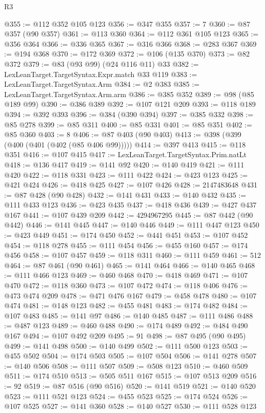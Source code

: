 \begin{lexlean}{R3}
\begin{coremodule}
@355 := @112 @352 @105 @123
@356 := @347 @355
@357 := 7
@360 := @87 @357 (@90 @357)
@361 := @113 @360
@364 := @112 @361 @105 @123
@365 := @356 @364
@366 := @336 @365
@367 := @316 @366
@368 := @283 @367
@369 := @194 @368
@370 := @172 @369
@372 := @106 (@135 @370)
@373 := @82 @372
@379 := @83 (@93 @99) (@24 @116 @11) @33
@382 := LexLeanTarget.TargetSyntax.Expr.match @33 @119
@383 := LexLeanTarget.TargetSyntax.Arm
@384 := @2 @383
@385 := LexLeanTarget.TargetSyntax.Arm.arm
@386 := @385 @352
@389 := @98 (@85 @189 @99)
@390 := @386 @389
@392 := @107 @121 @209
@393 := @118 @189
@394 := @392 @393
@396 := @384 (@390 @394)
@397 := @385 @332
@398 := @85 @278
@399 := @85 @311
@400 := @85 @331
@401 := @85 @351
@402 := @85 @360
@403 := 8
@406 := @87 @403 (@90 @403)
@413 := @398 (@399 (@400 (@401 (@402 (@85 @406 @99)))))
@414 := @397 @413
@415 := @118 @351
@416 := @107 @415
@417 := LexLeanTarget.TargetSyntax.Prim.natLt
@418 := @136 @417
@419 := @141 @92
@420 := @140 @419
@421 := @111 @420
@422 := @118 @331
@423 := @111 @422
@424 := @423 @123
@425 := @421 @424
@426 := @418 @425
@427 := @107 @426
@428 := 2147483648
@431 := @87 @428 (@90 @428)
@432 := @141 @431
@433 := @140 @432
@435 := @111 @433 @123
@436 := @423 @435
@437 := @418 @436
@439 := @427 @437 @167
@441 := @107 @439 @209
@442 := 4294967295
@445 := @87 @442 (@90 @442)
@446 := @141 @445
@447 := @140 @446
@449 := @111 @447 @123
@450 := @423 @449
@451 := @174 @450
@452 := @441 @451
@453 := @107 @452
@454 := @118 @278
@455 := @111 @454
@456 := @455 @160
@457 := @174 @456
@458 := @107 @457
@459 := @118 @311
@460 := @111 @459
@461 := 512
@464 := @87 @461 (@90 @461)
@465 := @141 @464
@466 := @140 @465
@468 := @111 @466 @123
@469 := @460 @468
@470 := @418 @469
@471 := @107 @470
@472 := @118 @360
@473 := @107 @472
@474 := @118 @406
@476 := @473 @474 @209
@478 := @471 @476 @167
@479 := @458 @478
@480 := @107 @474
@481 := @148 @123
@482 := @455 @481
@483 := @174 @482
@484 := @107 @483
@485 := @141 @97
@486 := @140 @485
@487 := @111 @486
@488 := @487 @123
@489 := @460 @488
@490 := @174 @489
@492 := @484 @490 @167
@494 := @107 @492 @209
@495 := 91
@498 := @87 @495 (@90 @495)
@499 := @141 @498
@500 := @140 @499
@502 := @111 @500 @123
@503 := @455 @502
@504 := @174 @503
@505 := @107 @504
@506 := @141 @278
@507 := @140 @506
@508 := @111 @507
@509 := @508 @123
@510 := @460 @509
@511 := @174 @510
@513 := @505 @511 @167
@515 := @107 @513 @209
@516 := 92
@519 := @87 @516 (@90 @516)
@520 := @141 @519
@521 := @140 @520
@523 := @111 @521 @123
@524 := @455 @523
@525 := @174 @524
@526 := @107 @525
@527 := @141 @360
@528 := @140 @527
@530 := @111 @528 @123

\end{coremodule}
\end{lexlean}
